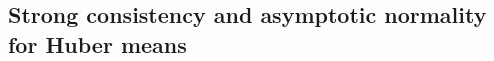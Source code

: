 \documentclass[preprint]{imsart}
\theoremstyle{plain}
\newtheorem{proposition}{Proposition}
\theoremstyle{remark}
\begin{document}






\subsection{Strong consistency and asymptotic normality for Huber means}\label{sec:asymptotics}
\end{document}
